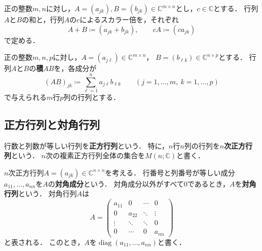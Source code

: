 \begin{defi}[行列の和とスカラー倍]
  正の整数$m,n$に対し，$A=(a_{jk}), B=(b_{jk})\in\mathbb C^{m\times n}$とし，$c\in\mathbb C$とする．
  行列$A$と$B$の和と，行列$A$の$c$によるスカラー倍を，それぞれ
  \begin{equation*}
    A+B\coloneq(a_{jk}+b_{jk}),
    \qquad
    cA\coloneq(ca_{jk})
  \end{equation*}
  で定める．
\end{defi}

\begin{defi}[行列の積]
  正の整数$m,n,p$に対し，$A=(a_{j\ell})\in\mathbb C^{m\times n}$，
  $B=(b_{\ell k})\in\mathbb C^{n\times p}$とする．
  行列$A$と$B$の\textbf{積}$AB$を，各成分が
  \begin{equation*}
    (AB)_{jk}\coloneq\sum_{\ell=1}^{n}a_{j\ell}b_{\ell k}
    \qquad (j=1,\ldots,m,\ k=1,\ldots,p)
  \end{equation*}
  で与えられる$m$行$p$列の行列とする．
\end{defi}

\subsection{正方行列と対角行列}

\begin{defi}[正方行列]
  行数と列数が等しい行列を\textbf{正方行列}という．
  特に，$n$行$n$列の行列を\textbf{$n$次正方行列}という．
  $n$次の複素正方行列全体の集合を$M(n;\mathbb C)$と書く．
\end{defi}

\begin{defi}[対角行列]
  $n$次正方行列$A=(a_{jk})\in\mathbb C^{n\times n}$を考える．
  行番号と列番号が等しい成分$a_{11},\ldots,a_{nn}$を$A$の\textbf{対角成分}という．
  対角成分以外がすべて$0$であるとき，$A$を\textbf{対角行列}という．
  対角行列$A$は
  \begin{equation*}
    A=
    \begin{pmatrix}
      a_{11} & 0 & \cdots & 0\\
      0 & a_{22} & \ddots & \vdots\\
      \vdots & \ddots & \ddots & 0\\
      0 & \cdots & 0 & a_{nn}
    \end{pmatrix}
  \end{equation*}
  と表される．
  このとき，$A$を$\operatorname{diag}(a_{11},\ldots,a_{nn})$と書く．
\end{defi}

